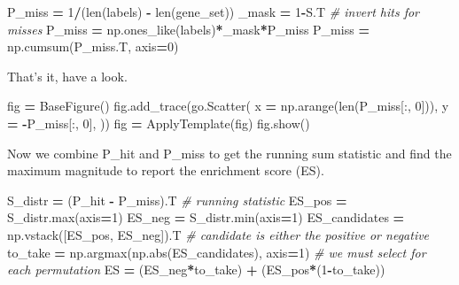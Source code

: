 \documentclass[
]{book}
\newenvironment{Shaded}{\begin{snugshade}}{\end{snugshade}}
\newcommand{\BuiltInTok}[1]{#1}
\newcommand{\CommentTok}[1]{\textcolor[rgb]{0.56,0.35,0.01}{\textit{#1}}}
\newcommand{\DecValTok}[1]{\textcolor[rgb]{0.00,0.00,0.81}{#1}}
\newcommand{\NormalTok}[1]{#1}
\newcommand{\OperatorTok}[1]{\textcolor[rgb]{0.81,0.36,0.00}{\textbf{#1}}}
\begin{document}
\begin{Shaded}
\begin{Highlighting}[numbers=left,,]
\NormalTok{P\_miss }\OperatorTok{=} \DecValTok{1}\OperatorTok{/}\NormalTok{(}\BuiltInTok{len}\NormalTok{(labels) }\OperatorTok{{-}} \BuiltInTok{len}\NormalTok{(gene\_set))}
\NormalTok{\_mask }\OperatorTok{=} \DecValTok{1}\OperatorTok{{-}}\NormalTok{S.T }\CommentTok{\# invert hits for misses}
\NormalTok{P\_miss }\OperatorTok{=}\NormalTok{ np.ones\_like(labels)}\OperatorTok{*}\NormalTok{\_mask}\OperatorTok{*}\NormalTok{P\_miss}
\NormalTok{P\_miss }\OperatorTok{=}\NormalTok{ np.cumsum(P\_miss.T, axis}\OperatorTok{=}\DecValTok{0}\NormalTok{)}
\end{Highlighting}
\end{Shaded}

That's it, have a look.

\begin{Shaded}
\begin{Highlighting}[numbers=left,,]
\NormalTok{fig }\OperatorTok{=}\NormalTok{ BaseFigure()}
\NormalTok{fig.add\_trace(go.Scatter(}
\NormalTok{    x }\OperatorTok{=}\NormalTok{ np.arange(}\BuiltInTok{len}\NormalTok{(P\_miss[:, }\DecValTok{0}\NormalTok{])),}
\NormalTok{    y }\OperatorTok{=} \OperatorTok{{-}}\NormalTok{P\_miss[:, }\DecValTok{0}\NormalTok{],}
\NormalTok{))}
\NormalTok{fig }\OperatorTok{=}\NormalTok{ ApplyTemplate(fig)}
\NormalTok{fig.show()}
\end{Highlighting}
\end{Shaded}

Now we combine P\_hit and P\_miss to get the running sum statistic
and find the maximum magnitude to report the enrichment score (ES).

\begin{Shaded}
\begin{Highlighting}[numbers=left,,]
\NormalTok{S\_distr }\OperatorTok{=}\NormalTok{ (P\_hit }\OperatorTok{{-}}\NormalTok{ P\_miss).T }\CommentTok{\# running statistic}
\NormalTok{ES\_pos }\OperatorTok{=}\NormalTok{ S\_distr.}\BuiltInTok{max}\NormalTok{(axis}\OperatorTok{=}\DecValTok{1}\NormalTok{)}
\NormalTok{ES\_neg }\OperatorTok{=}\NormalTok{ S\_distr.}\BuiltInTok{min}\NormalTok{(axis}\OperatorTok{=}\DecValTok{1}\NormalTok{)}
\NormalTok{ES\_candidates }\OperatorTok{=}\NormalTok{ np.vstack([ES\_pos, ES\_neg]).T       }\CommentTok{\# candidate is either the positive or negative}
\NormalTok{to\_take }\OperatorTok{=}\NormalTok{ np.argmax(np.}\BuiltInTok{abs}\NormalTok{(ES\_candidates), axis}\OperatorTok{=}\DecValTok{1}\NormalTok{)  }\CommentTok{\# we must select for each permutation}
\NormalTok{ES }\OperatorTok{=}\NormalTok{ (ES\_neg}\OperatorTok{*}\NormalTok{to\_take) }\OperatorTok{+}\NormalTok{ (ES\_pos}\OperatorTok{*}\NormalTok{(}\DecValTok{1}\OperatorTok{{-}}\NormalTok{to\_take))}
\end{Highlighting}
\end{Shaded}
\end{document}
